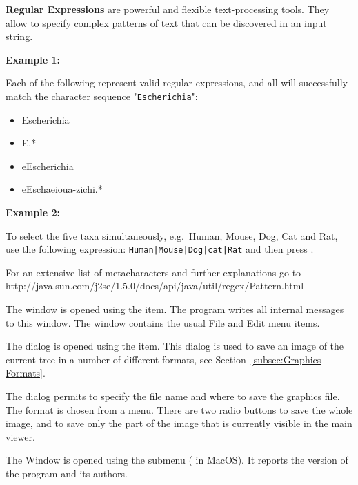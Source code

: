 \documentclass[11pt]{article}
\begin{document}
\textbf{Regular Expressions} are powerful and flexible text-processing tools.
They allow to specify complex patterns of text that can be discovered in an input string.

{\bf Example 1:}

Each of the following represent valid regular expressions, and all will successfully
match the character sequence "\texttt{Escherichia}":
\begin{itemize}
\item Escherichia
\item E.*
\item \lbrack eE\rbrack scherichia
\item \lbrack eE\rbrack sch\lbrack aeiou\rbrack \lbrack a-z\rbrack ichi.*
\end{itemize}

{\bf Example 2:}

To select the five taxa simultaneously, e.g.\ Human, Mouse, Dog, Cat and Rat,
use the following expression: {\tt Human|Mouse|Dog|cat|Rat} and then press .

For an extensive list of metacharacters and further explanations go to http://java.sun.com/j2se/1.5.0/docs/api/java/util/regex/Pattern.html



The  window is opened using the
 item.
The program writes all internal messages to this window.
The window contains the usual File and Edit menu items.

 \label{openexportimagedialog}
The  dialog is opened using the
 item.
This dialog is used to save an image of the current tree
in a number of different formats, see Section~\ref{subsec:Graphics Formats}. 

The dialog permits to specify the file name and  where to save the graphics file.
The format is chosen from a menu.
There are two radio buttons 
to save the whole image, and  to save
only the part of the image that is currently visible in the main viewer.


The  Window is opened using the
 submenu ( in MacOS). It reports the version of the program and its authors.
\end{document}
